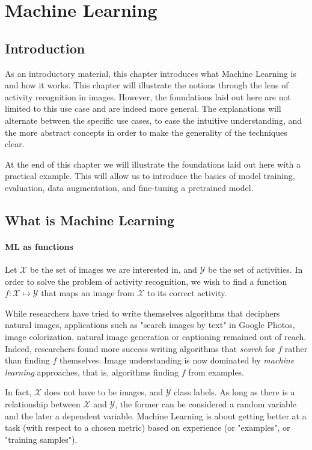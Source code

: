 \chapter{Machine Learning}
\label{chap:activity}

\section{Introduction}

As an introductory material, this chapter introduces what Machine Learning is and how it works. This chapter will illustrate the notions through the lens of activity recognition in images. However, the foundations laid out here are not limited to this use case and are indeed more general. The explanations will alternate between the specific use cases, to ease the intuitive understanding, and the more abstract concepts in order to make the generality of the techniques clear.

At the end of this chapter we will illustrate the foundations laid out here with a practical example. This will allow us to introduce the basics of model training, evaluation, data augmentation, and fine-tuning a pretrained model.

\section{What is Machine Learning}

\subsubsection{ML as functions}

Let $\mathcal{X}$ be the set of  images we are interested in, and $\mathcal{Y}$ be the set of activities. In order to solve the problem of activity recognition, we wish to find a function $f:\mathcal{X}\mapsto\mathcal{Y}$ that maps an image from $\mathcal{X}$ to its correct activity. 

While researchers have tried to write themselves algorithms that deciphers natural images, applications such as "search images by text" in Google Photos, image colorization, natural image generation or captioning remained out of reach. Indeed, researchers found more success writing algorithms that \emph{search} for $f$ rather than finding $f$ themselves. Image understanding is now dominated by \emph{machine learning} approaches, that is, algorithms finding $f$ from examples.

In fact, $\mathcal{X}$ does not have to be images, and $\mathcal{Y}$ class labels. As long as there is a relationship between $\mathcal{X}$ and $\mathcal{Y}$, the former can be considered a random variable and the later a dependent variable. Machine Learning is about getting better at a task (with respect to a chosen metric) based on experience (or "examples", or "training samples").

